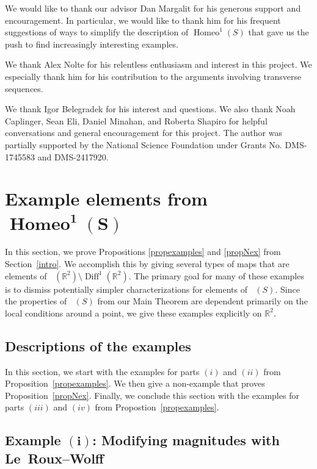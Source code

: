 \documentclass[sn-mathphys-num]{sn-jnl}%
\theoremstyle{thmstyleone}%
\theoremstyle{thmstyletwo}%
\theoremstyle{thmstylethree}%
\DeclareMathOperator{\homeo}{Homeo}
\DeclareMathOperator{\bhomeo}{\textbf{Homeo}}
\DeclareMathOperator{\diff}{Diff}
\DeclareMathOperator{\thomeo}{Homeo^{1}}
\begin{document}
We would like to thank our advisor Dan Margalit for his generous support and encouragement.  In particular, we would like to thank him for his frequent suggestions of ways to simplify the description of $\homeo^1(S)$ that gave us the push to find increasingly interesting examples.

We thank Alex Nolte for his relentless enthusiasm and interest in this project.  We especially thank him for his contribution to the arguments involving transverse sequences.

We thank Igor Belegradek for his interest and questions.  We also thank Noah Caplinger, Sean Eli,  Daniel Minahan,  and Roberta Shapiro for helpful conversations and general encouragement for this project. The author was partially supported by the National Science Foundation under Grants No.  DMS-1745583 and DMS-2417920.



\section{Example elements from $\mathbf{\bhomeo^1(S)}$} \label{examples}
In this section, we prove Propositions \ref{propexamples} and \ref{propNex} from Section~\ref{intro}.   We accomplish this by giving several types of maps that are elements of $\thomeo \!\left(\mathbb{R}^2\right){\setminus}\diff^1\!\left(\mathbb{R}^2\right)$.  The primary goal for many of these examples is to dismiss potentially simpler characterizations for elements of $\thomeo(S)$.  Since the properties of $\thomeo(S)$ from our Main Theorem are dependent primarily on the local conditions around a point,  we give these examples explicitly on $\mathbb{R}^2$.  

\subsection{Descriptions of the examples} \label{subexamples}

In this section,  we start with the examples for parts $(i)$ and $(ii)$ from Proposition~\ref{propexamples}.  We then give a non-example that proves Proposition~\ref{propNex}. Finally, we conclude this section with the examples for parts $(iii)$ and $(iv)$ from Propostion~\ref{propexamples}.


\subsection*{Example $\mathbf{(i)}$: Modifying magnitudes with Le~Roux--Wolff} 
\end{document}

